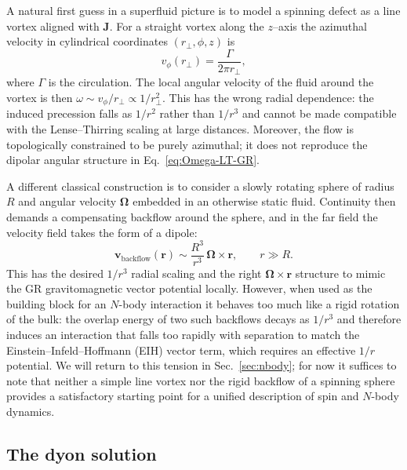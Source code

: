 \documentclass[11pt]{article}
\begin{document}
A natural first guess in a superfluid picture is to model a spinning
defect as a line vortex aligned with $\mathbf{J}$.
For a straight vortex along the $z$–axis the azimuthal velocity
in cylindrical coordinates $(r_\perp,\phi,z)$ is
\begin{equation}
  v_\phi(r_\perp)
  = \frac{\Gamma}{2\pi r_\perp},
\end{equation}
where $\Gamma$ is the circulation.
The local angular velocity of the fluid around the vortex is then
$\omega \sim v_\phi / r_\perp \propto 1/r_\perp^2$.
This has the wrong radial dependence: the induced precession falls as
$1/r^2$ rather than $1/r^3$ and cannot be made compatible with the
Lense--Thirring scaling at large distances.
Moreover, the flow is topologically constrained to be purely
azimuthal; it does not reproduce the dipolar angular structure in
Eq.~\eqref{eq:Omega-LT-GR}.

A different classical construction is to consider a slowly rotating
sphere of radius $R$ and angular velocity $\bm{\Omega}$ embedded in
an otherwise static fluid.
Continuity then demands a compensating backflow around the sphere,
and in the far field the velocity field takes the form of a dipole:
\begin{equation}
  \mathbf{v}_{\text{backflow}}(\mathbf{r})
  \sim \frac{R^3}{r^3}\,\bm{\Omega}\times\mathbf{r},
  \qquad r \gg R.
  \label{eq:backflow}
\end{equation}
This has the desired $1/r^3$ radial scaling and the right
$\bm{\Omega}\times\mathbf{r}$ structure to mimic the GR
gravitomagnetic vector potential locally.
However, when used as the building block for an $N$-body interaction
it behaves too much like a rigid rotation of the bulk: the overlap
energy of two such backflows decays as $1/r^3$ and therefore induces
an interaction that falls too rapidly with separation to match the
Einstein--Infeld--Hoffmann (EIH) vector term, which requires an
effective $1/r$ potential.
We will return to this tension in Sec.~\ref{sec:nbody}; for now it
suffices to note that neither a simple line vortex nor the rigid
backflow of a spinning sphere provides a satisfactory starting point
for a unified description of spin and $N$-body dynamics.

\subsection{The dyon solution}
\label{subsec:spin-dyon}
\end{document}
